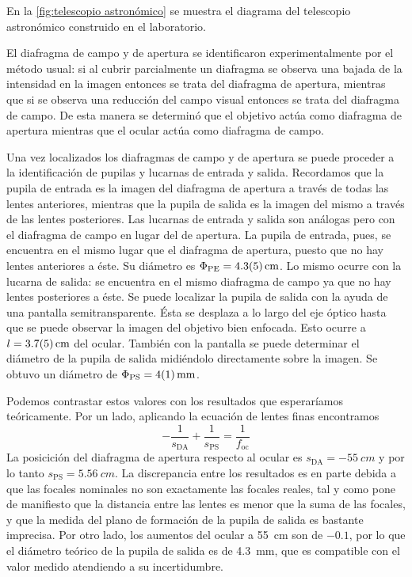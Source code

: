 \documentclass[12pt]{article}
\numberwithin{table}{section}
\numberwithin{figure}{section}
\numberwithin{equation}{section}
\newcommand{\data}[3]{\SI{#1 \pm #2}{#3}}
\begin{document}
En la \cref{fig:telescopio astronómico} se muestra el diagrama del telescopio astronómico construido en el laboratorio. 

El diafragma de campo y de apertura se identificaron experimentalmente por el método usual: si al cubrir parcialmente un diafragma se observa una bajada de la intensidad en la imagen entonces se trata del diafragma de apertura, mientras que si se observa una reducción del campo visual entonces se trata del diafragma de campo. De esta manera se determinó que el objetivo actúa como diafragma de apertura mientras que el ocular actúa como diafragma de campo. 

Una vez localizados los diafragmas de campo y de apertura se puede proceder a la identificación de pupilas y lucarnas de entrada y salida. Recordamos que la pupila de entrada es la imagen del diafragma de apertura a través de todas las lentes anteriores, mientras que la pupila de salida es la imagen del mismo a través de las lentes posteriores. Las lucarnas de entrada y salida son análogas pero con el diafragma de campo en lugar del de apertura. La pupila de entrada, pues, se encuentra en el mismo lugar que el diafragma de apertura, puesto que no hay lentes anteriores a éste. Su diámetro es \( \Phi_\text{PE} = \data{4.3}{0.5}{cm} \). Lo mismo ocurre con la lucarna de salida: se encuentra en el mismo diafragma de campo ya que no hay lentes posteriores a éste. Se puede localizar la pupila de salida con la ayuda de una pantalla semitransparente. Ésta se desplaza a lo largo del eje óptico hasta que se puede observar la imagen del objetivo bien enfocada. Esto ocurre a \( l = \data{3.7}{0.5}{cm} \) del ocular. También con la pantalla se puede determinar el diámetro de la pupila de salida midiéndolo directamente sobre la imagen. Se obtuvo un diámetro de \( \Phi_\text{PS} = \data{4}{1}{mm} \).

Podemos contrastar estos valores con los resultados que esperaríamos teóricamente. Por un lado, aplicando la ecuación de lentes finas encontramos
\begin{equation} \label{eqn:PS astronomico}
	-\frac{1}{s_\text{DA}} + \frac{1}{s_\text{PS}} = \frac{1}{f_\text{oc}}
\end{equation}
La posicición del diafragma de apertura respecto al ocular es \( s_{\text{DA}} = \SI{-55}{cm} \) y por lo tanto \( s_\text{PS} = \SI{5.56}{cm} \). La discrepancia entre los resultados es en parte debida a que las focales nominales no son exactamente las focales reales, tal y como pone de manifiesto que la distancia entre las lentes es menor que la suma de las focales, y que la medida del plano de formación de la pupila de salida es bastante imprecisa. Por otro lado, los aumentos del ocular a \SI{55}{cm} son de \( -0.1 \), por lo que el diámetro teórico de la pupila de salida es de \SI{4.3}{mm}, que es compatible con el valor medido atendiendo a su incertidumbre. 
\end{document}
